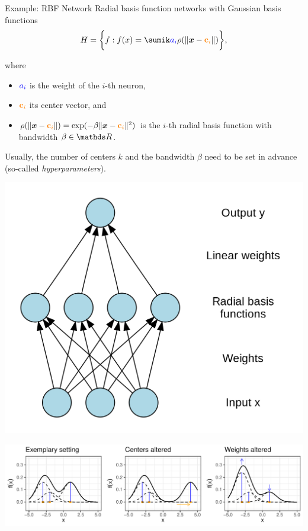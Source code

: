 \documentclass[11pt,compress,t,notes=noshow, xcolor=table]{beamer}
\begin{document}
\begin{vbframe}{Example: RBF Network}
Radial basis function networks with Gaussian basis functions
$$\Hspace = \bigg\{ f: \fx =  \sumik \textcolor{blue}{a_i} \rho ( \| \xv - 
\textcolor{orange}{\textbf{c}_i}  \|) 
\bigg\},$$ 

\begin{minipage}{0.55\textwidth}
  \small
  where 
  \begin{itemize}
    \item $\textcolor{blue}{a_i}$ is the weight of the $i$-th neuron, 
    \item $\textcolor{orange}{\textbf{c}_i}$ its center vector, and
    \item $\rho( \| \bm{x} - \textcolor{orange}{\textbf{c}_i} \|) = \exp(- \beta \| 
    \bm{x} - \textcolor{orange}{\textbf{c}_i} \|^2)$ is the $i$-th radial basis
    function with bandwidth $\beta \in \R$.
  \end{itemize}
  Usually, the number of centers $k$ and the bandwidth $\beta$ need to be set 
  in advance (so-called \emph{hyperparameters}).
  \normalsize
\end{minipage}%
\begin{minipage}{0.45\textwidth}
    \centering
    \includegraphics[width = 0.9\linewidth]{figure_man/rbf_network.png}
\end{minipage}

\framebreak

\begin{center}
  \includegraphics[width = \textwidth]{figure/hs-rbf-network-2d.pdf}
\end{center}


\end{vbframe}
\end{document}
